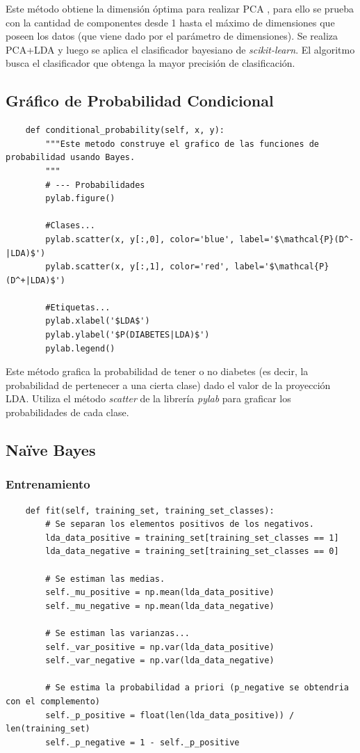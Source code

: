 \documentclass[letter, titlepage, 10pt]{article}
\begin{document}
Este método obtiene la dimensión óptima para realizar PCA , para ello se prueba con la cantidad de componentes desde 1 hasta el máximo de dimensiones que poseen los datos (que viene dado por el parámetro de dimensiones). Se realiza PCA+LDA y luego se aplica el clasificador bayesiano de \textit{scikit-learn}. El algoritmo busca el clasificador que obtenga la mayor precisión de clasificación.\\

\subsection{Gráfico de Probabilidad Condicional}
\begin{lstlisting} 
    def conditional_probability(self, x, y):
        """Este metodo construye el grafico de las funciones de probabilidad usando Bayes.
        """
        # --- Probabilidades
        pylab.figure()
        
        #Clases...
        pylab.scatter(x, y[:,0], color='blue', label='$\mathcal{P}(D^-|LDA)$')
        pylab.scatter(x, y[:,1], color='red', label='$\mathcal{P}(D^+|LDA)$')
        
        #Etiquetas...
        pylab.xlabel('$LDA$')
        pylab.ylabel('$P(DIABETES|LDA)$')
        pylab.legend()
\end{lstlisting}
Este método grafica la probabilidad de tener o no diabetes (es decir, la probabilidad de pertenecer a una cierta clase) dado el valor de la proyección LDA. Utiliza el método \textit{scatter} de la librería \textit{pylab} para graficar los probabilidades de cada clase.

\newpage

\subsection{Naïve Bayes}
\subsubsection{Entrenamiento}
\begin{lstlisting}
    def fit(self, training_set, training_set_classes):
        # Se separan los elementos positivos de los negativos.
        lda_data_positive = training_set[training_set_classes == 1]
        lda_data_negative = training_set[training_set_classes == 0]

        # Se estiman las medias.
        self._mu_positive = np.mean(lda_data_positive)
        self._mu_negative = np.mean(lda_data_negative)

        # Se estiman las varianzas...
        self._var_positive = np.var(lda_data_positive)
        self._var_negative = np.var(lda_data_negative)

        # Se estima la probabilidad a priori (p_negative se obtendria con el complemento)
        self._p_positive = float(len(lda_data_positive)) / len(training_set)
        self._p_negative = 1 - self._p_positive
\end{lstlisting}
\end{document}
